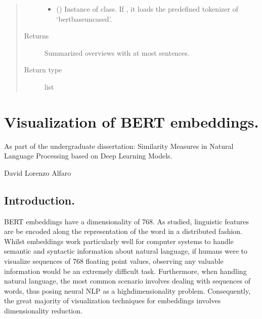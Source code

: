\documentclass[letterpaper,10pt,english]{sphinxmanual}
\begin{document}
\begin{fulllineitems}
\begin{quote}
\begin{description}
\begin{itemize}
\item {} 
 (\sphinxstyleliteralemphasis{\sphinxupquote{, }}) \textendash{} Instance of  class. If , it loads the
predefined tokenizer of ‘bert\sphinxhyphen{}base\sphinxhyphen{}uncased’.

\end{itemize}

\item[{Returns}] \leavevmode
Summarized overviews with at most  sentences.

\item[{Return type}] \leavevmode
list

\end{description}\end{quote}

\end{fulllineitems}



\chapter{Visualization of BERT embeddings.}
\label{\detokenize{Visualization of BERT embeddings:Visualization-of-BERT-embeddings.}}\label{\detokenize{Visualization of BERT embeddings::doc}}


As part of the undergraduate dissertation: Similarity Measures in Natural Language Processing based on Deep Learning Models.





David Lorenzo Alfaro




\section{Introduction.}
\label{\detokenize{Visualization of BERT embeddings:Introduction.}}
BERT embeddings have a dimensionality of 768. As studied, linguistic features are be encoded along the representation of the word in a distributed fashion. Whilst embeddings work particularly well for computer systems to handle semantic and syntactic information about natural language, if humans were to visualize sequences of 768 floating point values, observing any valuable information would be an extremely difficult task. Furthermore, when handling natural language, the most common scenario
involves dealing with sequences of words, thus posing neural NLP as a high\sphinxhyphen{}dimensionality problem. Consequently, the great majority of visualization techniques for embeddings involves dimensionality reduction.
\end{document}

